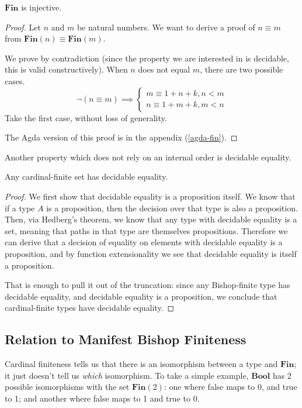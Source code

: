 \begin{rm-lemma} \label{fin-inj}
  \(\textbf{Fin}\) is injective.
\end{rm-lemma}
\begin{proof}
  Let \(n\) and \(m\) be natural numbers.
  We want to derive a proof of \(n \equiv m\) from \(\textbf{Fin}(n) \equiv
  \textbf{Fin}(m)\).

  We prove by contradiction (since the property we are interested in is
  decidable, this is valid constructively).
  When \(n\) does not equal \(m\), there are two possible cases.
  \begin{equation}
    \neg (n \equiv m) \implies
    \begin{cases}
      m \equiv 1 + n + k, n < m  \\
      n \equiv 1 + m + k, m < n
    \end{cases}
  \end{equation}
  Take the first case, without loss of generality.

  The Agda version of this proof is in the appendix (\ref{agda-fin}).
\end{proof}

Another property which does not rely on an internal order is decidable equality.
\begin{rm-theorem} \label{cardinal-finite-discrete}
  Any cardinal-finite set has decidable equality.
\end{rm-theorem}
\begin{proof}
  We first show that decidable equality is a proposition itself.
  We know that if a type \(A\) is a proposition, then the decision over that
  type is also a proposition.
  Then, via Hedberg's theorem, we know that any type with decidable equality is
  a set, meaning that paths in that type are themselves propositions.
  Therefore we can derive that a decision of equality on elements with decidable
  equality is a proposition, and by function extensionality we see that
  decidable equality is itself a proposition.

  That is enough to pull it out of the truncation: since any Bishop-finite type
  has decidable equality, and decidable equality is a proposition, we conclude
  that cardinal-finite types have decidable equality.
\end{proof}
\subsection{Relation to Manifest Bishop Finiteness}
Cardinal finiteness tells us that there is an isomorphism between a type and
\(\mathbf{Fin}\); it just doesn't tell us \emph{which} isomorphism.
To take a simple example, \(\mathbf{Bool}\) has 2 possible isomorphisms with the
set \(\mathbf{Fin}(2)\): one where false maps to 0, and true to 1; and another
where false maps to 1 and true to 0.

